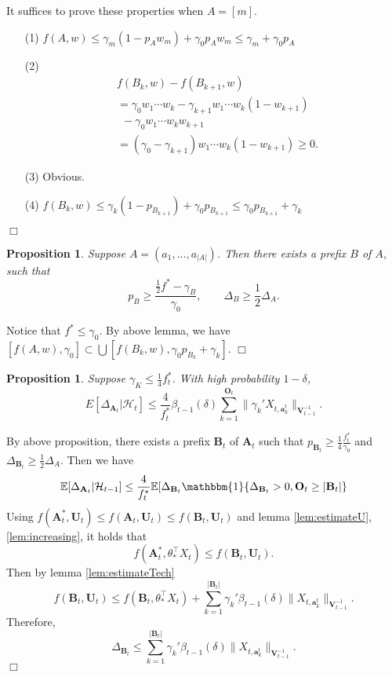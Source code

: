 \documentclass{article}
\newcommand{\EE}{\mathbb{E}}
\newcommand{\bOne}{\mathbbm{1}}
\newcommand{\bA}{\mathbf{A}}
\newcommand{\ba}{\mathbf{a}}
\newcommand{\bB}{\mathbf{B}}
\newcommand{\bO}{\mathbf{O}}
\newcommand{\bU}{\mathbf{U}}
\newcommand{\bV}{\mathbf{V}}
\newcommand{\cH}{\mathcal{H}}
\newcommand{\abs}[1]{\left| #1 \right|}
\newcommand{\norm}[1]{\| #1 \|}
\newtheorem{proposition}[theorem]{Proposition}%
\newenvironment{proof}{\noindent {\textbf{Proof. }}}{$\Box$ \medskip}
\begin{document}
\begin{proof}
It suffices to prove these properties when $A = [m]$.
\begin{itemize}
\item[(1)]
$f(A, w) \leq \gamma_m(1 - p_A w_m) + \gamma_0 p_A w_m \leq \gamma_m + \gamma_0 p_A$

\item[(2)]
\begin{align*}
&f(B_k, w) - f(B_{k+1}, w)\\
&=\gamma_0 w_1 \cdots w_k - \gamma_{k+1} w_1 \cdots w_k (1 - w_{k+1})\\
&~~ - \gamma_0 w_1 \cdots w_{k} w_{k+1}\\
&=(\gamma_0 - \gamma_{k+1}) w_1 \cdots w_k (1 - w_{k+1}) \geq 0.
\end{align*}

\item[(3)]
Obvious.

\item[(4)]
$f(B_k, w) \leq \gamma_k (1 - p_{B_{k+1}}) + \gamma_0 p_{B_{k+1}}\leq \gamma_0 p_{B_{k+1}} + \gamma_{k}$
\end{itemize}
\end{proof}

\begin{proposition}
Suppose $A = (a_1, ..., a_{\abs{A}})$. Then there exists a prefix $B$ of $A$, such that 
$$
p_{B} \geq \frac{\frac{1}{2}f^* - \gamma_{B}}{\gamma_0}, \qquad \Delta_{B} \geq \frac{1}{2}\Delta_A.
$$ 
\end{proposition}
\begin{proof}
	Notice that $f^* \leq \gamma_0$. By above lemma, we have $[f(A,w), \gamma_0] \subset \bigcup [f(B_k,w), \gamma_0 p_{B_k} + \gamma_k]$.
\end{proof}


\begin{proposition}
Suppose $\gamma_K \leq \frac{1}{4} f_t^*$. With high probability $1-\delta$, 
$$
E[\Delta_{\bA_t}|\cH_t] \leq \frac{4}{f_t^*} \beta_{t-1}(\delta)\sum_{k=1}^{\bO_t}\norm{\gamma_k' X_{t,\ba_k^t}}_{\bV_{t-1}^{-1}}.
$$
\end{proposition}
\begin{proof}
By above proposition, there exists a prefix $\bB_t$ of $\bA_t$ such that $p_{\bB_t} \geq \frac{1}{4}\frac{f_t^*}{\gamma_0}$ and $\Delta_{\bB_t} \geq \frac{1}{2}\Delta_A$. Then we have
$$
\EE[\Delta_{\bA_t} | \cH_{t-1}] \leq \frac{4}{f_t^*} \EE[\Delta_{\bB_t} \bOne\{\Delta_{\bB_t} > 0, \bO_t \geq \abs{\bB_t}\}
$$
Using $f(\bA_t^*,\bU_t) \leq f(\bA_t,\bU_t) \leq f(\bB_t,\bU_t)$ and lemma \ref{lem:estimateU}, \ref{lem:increasing}, it holds that
$$
f(\bA_t^*, \theta_*^{\top}X_t) \leq f(\bB_t,\bU_t).
$$
Then by lemma \ref{lem:estimateTech}
$$
f(\bB_t,\bU_t) \leq f(\bB_t, \theta_*^{\top}X_t) + \sum_{k=1}^{\abs{\bB_t}}\gamma_k'\beta_{t-1}(\delta)\norm{X_{t,\ba_k^t}}_{\bV_{t-1}^{-1}}.
$$
Therefore,
$$
\Delta_{\bB_t} \leq \sum_{k=1}^{\abs{\bB_t}}\gamma_k'\beta_{t-1}(\delta)\norm{X_{t,\ba_k^t}}_{\bV_{t-1}^{-1}}.
$$
\end{proof}
\end{document}
